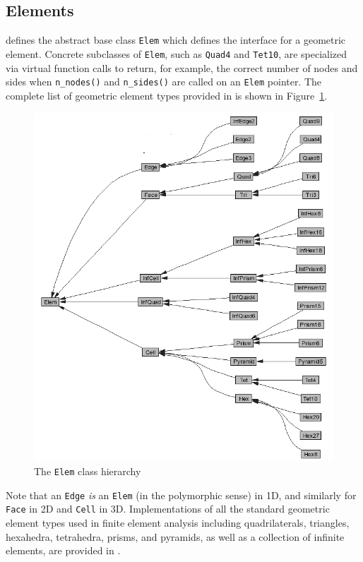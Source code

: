 \subsection{Elements}
\libMesh{} defines the abstract base class \texttt{Elem} which
defines the interface for a geometric element.  Concrete
subclasses of \texttt{Elem}, such as \texttt{Quad4} and
\texttt{Tet10}, are specialized via virtual function calls to return, for example, the correct number of nodes and sides when \texttt{n\_nodes()} and
\texttt{n\_sides()} are called on an \texttt{Elem} pointer.  The
complete list of geometric element types provided in \libMesh{} is shown in
Figure~\ref{fig:elem_class}.
\begin{figure}
  \begin{center}
    \includegraphics[width=.95\textwidth]{figures/data_structures/inherit_graph}    
    \caption{The \texttt{Elem} class hierarchy\label{fig:elem_class}}
  \end{center}
\end{figure}
Note that an \texttt{Edge} \emph{is} an \texttt{Elem} (in the polymorphic
sense) in 1D, and similarly for \texttt{Face} in 2D and \texttt{Cell} in 3D.
Implementations of all the standard geometric element types used in finite
element analysis including quadrilaterals, triangles, hexahedra, tetrahedra,
prisms, and pyramids, as well as a collection of infinite elements, are
provided in \libMesh.

